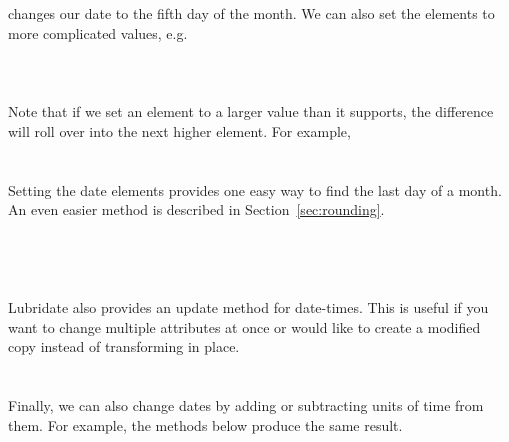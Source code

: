 \documentclass[article]{jss}
\begin{document}
\\
\\

changes our date to the fifth day of the month. We can also set the elements to more complicated values, e.g.\\

\\
\\
\\

Note that if we set an element to a larger value than it supports, the difference will roll over into the next higher element. For example,\\

\\
\\

Setting the date elements provides one easy way to find the last day of a month. An even easier method is described in Section~\ref{sec:rounding}.\\

\\
\\
\\
\\


Lubridate also provides an update method for date-times.  This is useful if you want to change multiple attributes at once or would like to create a modified copy instead of transforming in place.\\

\\
\\

Finally, we can also change dates by adding or subtracting units of time from them. For example, the methods below produce the same result.\\

\\

\\
\\
\end{document}
